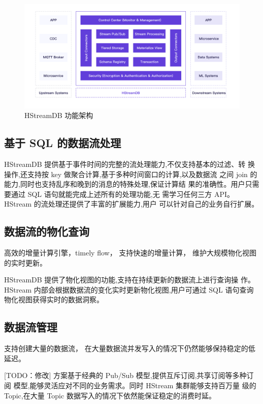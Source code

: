\documentclass{ctexart}
\begin{document}
\begin{figure}
  \centering
  \includegraphics[width=\textwidth]{pic/hstream-features.png}
  \caption{HStreamDB 功能架构}
  \label{fig:hstream-features}
\end{figure}

\subsection{基于 SQL 的数据流处理}

HStreamDB 提供基于事件时间的完整的流处理能力,不仅支持基本的过滤、转
换操作,还支持按 key 做聚合计算,基于多种时间窗口的计算,以及数据流
之间 join 的能力,同时也支持乱序和晚到的消息的特殊处理,保证计算结
果的准确性。用户只需要通过 SQL 语句就能完成上述所有的处理功能,无
需学习任何三方 API。HStream 的流处理还提供了丰富的扩展能力,用户
可以针对自己的业务自行扩展。

\subsection{数据流的物化查询}

高效的增量计算引擎，timely flow，
支持快速的增量计算，
维护大规模物化视图的实时更新。

HStreamDB 提供了物化视图的功能,支持在持续更新的数据流上进行查询操
作。 HStream 内部会根据数据流的变化实时更新物化视图,用户可通过 SQL
语句查询物化视图获得实时的数据洞察。

\subsection{数据流管理}

支持创建大量的数据流，
在大量数据流并发写入的情况下仍然能够保持稳定的低延迟。

[TODO：修改]
方案基于经典的 Pub/Sub 模型,提供互斥订阅,共享订阅等多种订阅
模型,能够灵活应对不同的业务需求。同时 HStream 集群能够支持百万量
级的 Topic,在大量 Topic 数据写入的情况下依然能保证稳定的消费时延。
\end{document}
